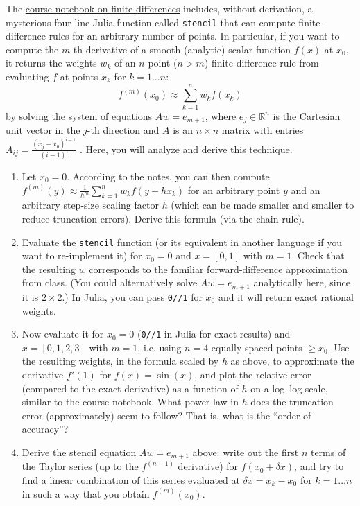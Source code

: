 \documentclass[10pt,oneside]{article}
\begin{document}
The \href{https://github.com/mitmath/matrixcalc/blob/a2c2d3c5f9269f501fa03cd14e3fbe8d219df211/notes/Finite\%20difference\%20checks.ipynb}{course notebook on finite differences}
includes, without derivation, a mysterious four-line Julia function
called \texttt{stencil} that can compute finite-difference rules for
an arbitrary number of points. In particular, if you want to compute
the $m$-th derivative of a smooth (analytic) scalar function $f(x)$
at $x_{0}$, it returns the weights $w_{k}$ of an $n$-point ($n>m$)
finite-difference rule from evaluating $f$ at points $x_{k}$ for
$k=1\ldots n$:
\[
f^{(m)}(x_{0})\approx\sum_{k=1}^{n}w_{k}f(x_{k})
\]
by solving the system of equations $Aw=e_{m+1}$, where $e_{j}\in\mathbb{R}^{n}$
is the Cartesian unit vector in the $j$-th direction and $A$ is
an $n\times n$ matrix with entries $A_{ij}=\frac{(x_{j}-x_{0})^{i-1}}{(i-1)!}$
. Here, you will analyze and derive this technique.
\begin{enumerate}
\item Let $x_{0}=0$. According to the notes, you can then compute $f^{(m)}(y)\approx\frac{1}{h^{m}}\sum_{k=1}^{n}w_{k}f(y+hx_{k})$
for an arbitrary point $y$ and an arbitrary step-size scaling factor
$h$ (which can be made smaller and smaller to reduce truncation errors).
Derive this formula (via the chain rule).
\item Evaluate the \texttt{stencil} function (or its equivalent in another
language if you want to re-implement it) for $x_{0}=0$ and $x=[0,1]$
with $m=1$. Check that the resulting $w$ corresponds to the familiar
forward-difference approximation from class. (You could alternatively
solve $Aw=e_{m+1}$ analytically here, since it is $2\times2$.) In
Julia, you can pass \texttt{0//1} for $x_{0}$ and it will return
exact rational weights.
\item Now evaluate it for $x_{0}=0$ (\texttt{0//1} in Julia for exact results)
and $x=[0,1,2,3]$ with $m=1$, i.e. using $n=4$ equally spaced points
$\ge x_{0}$. Use the resulting weights, in the formula scaled by
$h$ as above, to approximate the derivative $f'(1)$ for $f(x)=\sin(x)$,
and plot the relative error (compared to the exact derivative) as
a function of $h$ on a log–log scale, similar to the course notebook.
What power law in $h$ does the truncation error (approximately) seem
to follow? That is, what is the “order of accuracy”?
\item Derive the stencil equation $Aw=e_{m+1}$ above: write out the first
$n$ terms of the Taylor series (up to the $f^{(n-1)}$ derivative) for $f(x_{0}+\delta x)$, and try
to find a linear combination of this series evaluated at $\delta x=x_{k}-x_{0}$
for $k=1\ldots n$ in such a way that you obtain $f^{(m)}(x_{0})$.
\end{enumerate}
\end{document}
